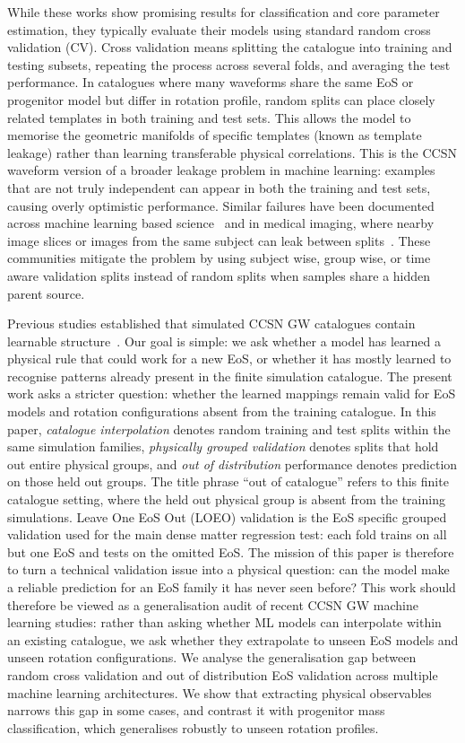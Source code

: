 \documentclass[reprint,aps,prd,floatfix,nofootinbib,superscriptaddress,showpacs]{revtex4-2}
\begin{document}
While these works show promising results for classification and core parameter estimation, they typically evaluate their models using standard random cross validation (CV). Cross validation means splitting the catalogue into training and testing subsets, repeating the process across several folds, and averaging the test performance. In catalogues where many waveforms share the same EoS or progenitor model but differ in rotation profile, random splits can place closely related templates in both training and test sets. This allows the model to memorise the geometric manifolds of specific templates (known as template leakage) rather than learning transferable physical correlations. This is the CCSN waveform version of a broader leakage problem in machine learning: examples that are not truly independent can appear in both the training and test sets, causing overly optimistic performance. Similar failures have been documented across machine learning based science~\cite{kapoor2023} and in medical imaging, where nearby image slices or images from the same subject can leak between splits~\cite{tampu2022}. These communities mitigate the problem by using subject wise, group wise, or time aware validation splits instead of random splits when samples share a hidden parent source.

Previous studies established that simulated CCSN GW catalogues contain learnable structure~\cite{engels2014,edwards2021,chao2022}. Our goal is simple: we ask whether a model has learned a physical rule that could work for a new EoS, or whether it has mostly learned to recognise patterns already present in the finite simulation catalogue. The present work asks a stricter question: whether the learned mappings remain valid for EoS models and rotation configurations absent from the training catalogue. In this paper, \textit{catalogue interpolation} denotes random training and test splits within the same simulation families, \textit{physically grouped validation} denotes splits that hold out entire physical groups, and \textit{out of distribution} performance denotes prediction on those held out groups. The title phrase ``out of catalogue'' refers to this finite catalogue setting, where the held out physical group is absent from the training simulations. Leave One EoS Out (LOEO) validation is the EoS specific grouped validation used for the main dense matter regression test: each fold trains on all but one EoS and tests on the omitted EoS. The mission of this paper is therefore to turn a technical validation issue into a physical question: can the model make a reliable prediction for an EoS family it has never seen before? This work should therefore be viewed as a generalisation audit of recent CCSN GW machine learning studies: rather than asking whether ML models can interpolate within an existing catalogue, we ask whether they extrapolate to unseen EoS models and unseen rotation configurations. We analyse the generalisation gap between random cross validation and out of distribution EoS validation across multiple machine learning architectures. We show that extracting physical observables narrows this gap in some cases, and contrast it with progenitor mass classification, which generalises robustly to unseen rotation profiles.
\end{document}
